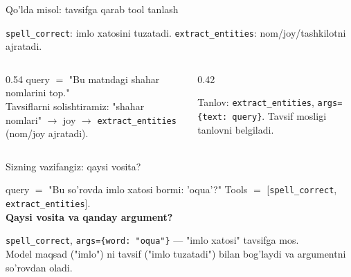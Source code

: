 \documentclass[aspectratio=169,11pt]{beamer}
\begin{document}
\begin{frame}{Qo'lda misol: tavsifga qarab tool tanlash}
  \begin{tcolorbox}[defbox,title={Vositalar tavsifi}]
    \footnotesize
    \texttt{spell\_correct}: imlo xatosini tuzatadi. \quad
    \texttt{extract\_entities}: nom/joy/tashkilotni ajratadi.
  \end{tcolorbox}
  \vspace{0.2em}
  \begin{columns}[T]
    \begin{column}{0.54\textwidth}
      \small query $=$ "Bu matndagi shahar nomlarini top."\\[3pt]
      \footnotesize
      Tavsiflarni solishtiramiz: "shahar nomlari" $\to$ joy $\to$
      \texttt{extract\_entities} (nom/joy ajratadi).
    \end{column}
    \begin{column}{0.42\textwidth}
      \begin{tcolorbox}[okbox,top=2pt,bottom=2pt]
        \footnotesize
        Tanlov: \texttt{extract\_entities}, \texttt{args=\{text: query\}}.
        Tavsif mosligi tanlovni belgiladi.
      \end{tcolorbox}
    \end{column}
  \end{columns}
\end{frame}

\begin{frame}{Sizning vazifangiz: qaysi vosita?}
  \begin{tcolorbox}[warnbox,title=Savol --- 60 soniya]
    \small
    query $=$ "Bu so'rovda imlo xatosi bormi: 'oqua'?" \;
    Tools $=$ [\texttt{spell\_correct}, \texttt{extract\_entities}].\\[4pt]
    \textbf{Qaysi vosita va qanday argument?}
  \end{tcolorbox}
  \pause
  \begin{tcolorbox}[okbox,title=Javob]
    \small
    \texttt{spell\_correct}, \texttt{args=\{word: "oqua"\}} --- "imlo xatosi"
    tavsifga mos.\\[3pt]
    \footnotesize Model maqsad ("imlo") ni tavsif ("imlo tuzatadi") bilan
    bog'laydi va argumentni so'rovdan oladi.
  \end{tcolorbox}
\end{frame}
\end{document}
